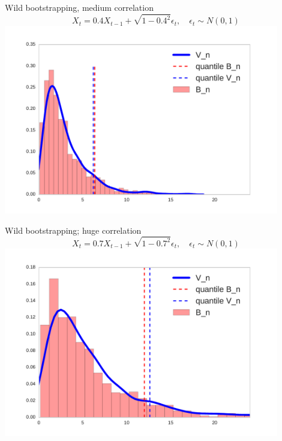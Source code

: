 \documentclass{beamer}
\begin{document}
 \begin{frame}{Wild bootstrapping, medium correlation}
\centering
 $$X_t = 0.4 X_{t-1} + \sqrt{1 - 0.4^2}\epsilon_t, \quad \epsilon_t \sim N(0,1)$$
 \includegraphics[width=0.9\textwidth]{./img/bootstrapWorks4.pdf}
\end{frame}

 \begin{frame}{Wild bootstrapping; huge correlation}
\centering
 $$X_t = 0.7 X_{t-1} + \sqrt{1 - 0.7^2}\epsilon_t, \quad \epsilon_t \sim N(0,1)$$
 \includegraphics[width=0.9\textwidth]{./img/bootstrapWorks7.pdf}
\end{frame}

 
 \iffalse
\end{document}
